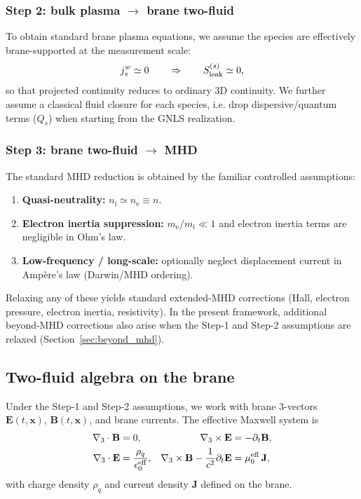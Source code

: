 \documentclass[11pt]{article}
\newcommand{\x}{\mathbf{x}}     %
\newcommand{\gradthree}{\nabla_3}
\newcommand{\ion}{\mathrm{i}}
\newcommand{\ele}{\mathrm{e}}
\newcommand{\E}{\mathbf{E}}
\newcommand{\B}{\mathbf{B}}
\newcommand{\Jb}{\mathbf{J}}
\newcommand{\Sleak}{S_{\rm leak}}
\newcommand{\muzeff}{\mu_0^{\rm eff}}
\begin{document}
\subsubsection*{Step 2: bulk plasma \(\to\) brane two-fluid}
To obtain standard brane plasma equations, we assume the species are effectively
brane-supported at the measurement scale:
\begin{equation}
j_s^w \simeq 0
\qquad\Rightarrow\qquad
\Sleak^{(s)} \simeq 0,
\label{eq:twofluid_leakage_suppression}
\end{equation}
so that projected continuity reduces to ordinary \(3\)D continuity. We further assume
a classical fluid closure for each species, i.e. drop dispersive/quantum terms
(\(Q_s\)) when starting from the GNLS realization.

\subsubsection*{Step 3: brane two-fluid \(\to\) MHD}
The standard MHD reduction is obtained by the familiar controlled assumptions:
\begin{enumerate}[leftmargin=1.6em]
\item \textbf{Quasi-neutrality:} \(n_\ion \simeq n_\ele \equiv n\).
\item \textbf{Electron inertia suppression:} \(m_\ele/m_\ion \ll 1\) and electron
inertia terms are negligible in Ohm's law.
\item \textbf{Low-frequency / long-scale:} optionally neglect displacement current in
Amp\`ere's law (Darwin/MHD ordering).
\end{enumerate}
Relaxing any of these yields standard extended-MHD corrections (Hall, electron pressure,
electron inertia, resistivity). In the present framework, additional beyond-MHD
corrections also arise when the Step-1 and Step-2 assumptions are relaxed (Section~\ref{sec:beyond_mhd}).

\subsection{Two-fluid algebra on the brane}
\label{sec:two_fluid_algebra}

Under the Step-1 and Step-2 assumptions, we work with brane \(3\)-vectors
\(\E(t,\x)\), \(\B(t,\x)\), and brane currents. The effective Maxwell system is
\begin{align}
\gradthree\cdot \B &= 0,
&
\gradthree\times \E &= -\partial_t \B,
\label{eq:maxwell_hom_brane}
\\
\gradthree\cdot \E &= \frac{\rho_q}{\epsilon_0^{\rm eff}},
&
\gradthree\times \B - \frac{1}{c^2}\partial_t \E &= \muzeff\,\Jb,
\label{eq:maxwell_inhom_brane}
\end{align}
with charge density \(\rho_q\) and current density \(\Jb\) defined on the brane.
\end{document}
